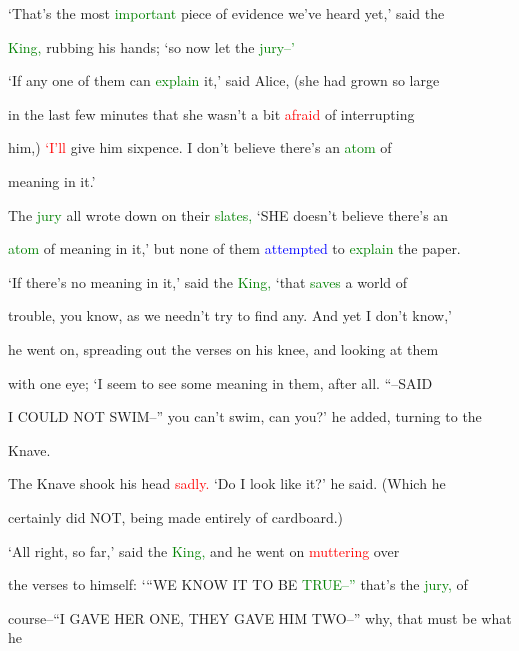  ‘That’s the most \textcolor{green}{important} piece of evidence we’ve heard yet,’ said the

 \textcolor{green}{King,} rubbing his hands; ‘so now let the \textcolor{green}{jury--’}



 ‘If any one of them can \textcolor{green}{explain} it,’ said Alice, (she had grown so large

 in the last few minutes that she wasn’t a bit \textcolor{red}{afraid} of \textcolor{BurntOrange}{interrupting}

 him,) \textcolor{red}{‘I’ll} give him sixpence. I don’t believe there’s an \textcolor{green}{atom} of

 meaning in it.’



 The \textcolor{green}{jury} all wrote down on their \textcolor{green}{slates,} ‘SHE doesn’t believe there’s an

 \textcolor{green}{atom} of meaning in it,’ but none of them \textcolor{blue}{attempted} to \textcolor{green}{explain} the paper.



 ‘If there’s no meaning in it,’ said the \textcolor{green}{King,} ‘that \textcolor{green}{saves} a world of

 trouble, you know, as we needn’t try to find any. And yet I don’t know,’

 he went on, spreading out the verses on his knee, and looking at them

 with one eye; ‘I seem to see some meaning in them, after all. “--SAID

 I COULD NOT \textcolor{BurntOrange}{SWIM--”} you can’t \textcolor{BurntOrange}{swim,} can you?’ he added, turning to the

 Knave.



 The Knave shook his head \textcolor{red}{sadly.} ‘Do I look like it?’ he said. (Which he

 certainly did NOT, being made entirely of cardboard.)



 ‘All right, so far,’ said the \textcolor{green}{King,} and he went on \textcolor{red}{muttering} over

 the verses to himself: ‘“WE KNOW IT TO BE \textcolor{green}{TRUE--”} that’s the \textcolor{green}{jury,} of

 course--“I GAVE HER ONE, THEY GAVE HIM TWO--” why, that must be what he

